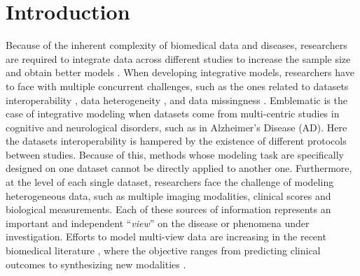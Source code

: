 \section{Introduction}

Because of the inherent complexity of biomedical data and diseases,
researchers are required to integrate data across different studies to increase the sample size and obtain better models \citep{LeSueur2020}.
%
When developing integrative models, researchers have to face with multiple concurrent challenges, such as the ones related to
datasets interoperability \citep{Tognin2020},
data heterogeneity \citep{Buch2020},
and data missingness \citep{GolrizKhatami2020}.
%
Emblematic is the case of integrative modeling when datasets come from multi-centric studies in cognitive and neurological disorders,
such as in Alzheimer's Disease (AD).
%
Here the datasets interoperability is hampered by the existence of different protocols between studies.
Because of this, methods whose modeling task are specifically designed on one dataset cannot be directly applied to another one.
Furthermore, at the level of each single dataset, researchers face the challenge of modeling heterogeneous data,
such as multiple imaging modalities, clinical scores and biological measurements.
Each of these sources of information represents an important and independent ``\textit{view}'' on the disease or phenomena under investigation.
Efforts to model multi-view data are increasing in the recent biomedical literature \citep{Vieira2020,Venugopalan2021},
where the objective ranges from predicting clinical outcomes \citep{Chen2019,AbiNader2020,Tabarestani2020}
to synthesizing new modalities \citep{Zhou2020, Wei2020}.

